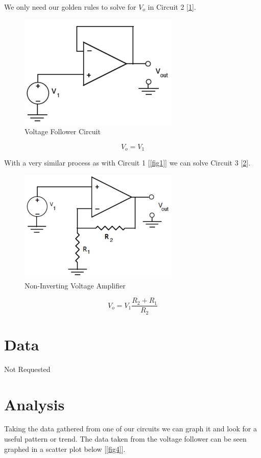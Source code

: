 \documentclass[prb,preprint]{revtex4-1}
\begin{document}
We only need our golden rules to solve for $V_{o}$ in Circuit 2 [\ref{fig2}].

\begin{figure}[ht]
	\centering
	\includegraphics[width=3in]{circuit2.png}
	\caption{Voltage Follower Circuit}
	\label{fig2}
\end{figure}

\begin{equation}
V_{o}=V_{1}
\label{eq6}
\end{equation}


With a very similar process as with Circuit 1 [\ref{fig1}] we can solve Circuit 3 [\ref{fig3}].

\begin{figure}[ht]
	\centering
	\includegraphics[width=3in]{circuit3.png}
	\caption{Non-Inverting Voltage Amplifier}
	\label{fig3}
\end{figure}

\begin{equation}
V_{o}=V_{1}\frac{R_{2}+R_{1}}{R_{2}}
\end{equation}

\section{Data}
Not Requested

\section{Analysis}
Taking the data gathered from one of our circuits we can graph it and look for a useful pattern or trend. The data taken from the voltage follower can be seen graphed in a scatter plot below [\ref{fig4}].
\end{document}
